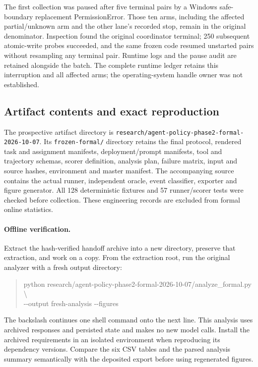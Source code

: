 \documentclass[11pt,a4paper]{article}
\newcommand{\code}[1]{\nolinkurl{#1}}
\begin{document}
The first collection was paused after five terminal pairs by a Windows safe-boundary replacement PermissionError. Those ten arms, including the affected partial/unknown arm and the other lane's recorded stop, remain in the original denominator. Inspection found the original coordinator terminal; 250 subsequent atomic-write probes succeeded, and the same frozen code resumed unstarted pairs without resampling any terminal pair. Runtime logs and the pause audit are retained alongside the batch. The complete runtime ledger retains this interruption and all affected arms; the operating-system handle owner was not established.

\subsection{Artifact contents and exact reproduction}
The prospective artifact directory is \code{research/agent-policy-phase2-formal-2026-10-07}. Its \code{frozen-formal/} directory retains the final protocol, rendered task and assignment manifests, deployment/prompt manifests, tool and trajectory schemas, scorer definition, analysis plan, failure matrix, input and source hashes, environment and master manifest. The accompanying source contains the actual runner, independent oracle, event classifier, exporter and figure generator. All 128 deterministic fixtures and 57 runner/scorer tests were checked before collection. These engineering records are excluded from formal online statistics.

\paragraph{Offline verification.}
Extract the hash-verified handoff archive into a new directory, preserve that extraction, and work on a copy. From the extraction root, run the original analyzer with a fresh output directory:
\begin{quote}\footnotesize\ttfamily
python research/agent-policy-phase2-formal-2026-10-07/analyze\_formal.py \textbackslash\\
\hspace*{1em}-{}-output fresh-analysis -{}-figures
\end{quote}
The backslash continues one shell command onto the next line. This analysis uses archived responses and persisted state and makes no new model calls. Install the archived requirements in an isolated environment when reproducing its dependency versions. Compare the six CSV tables and the parsed analysis summary semantically with the deposited export before using regenerated figures.
\end{document}
